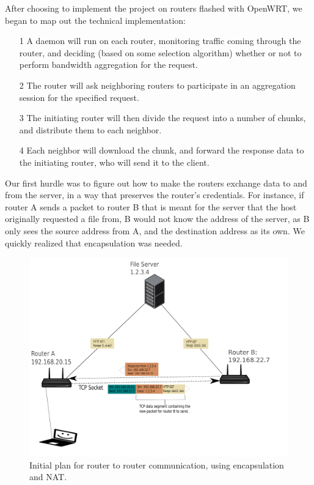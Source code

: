 \documentclass[12pt]{article}
\begin{document}
		After choosing to implement the project on routers flashed with OpenWRT, we began to map out the technical implementation:
		\begin{itemize}
			\item[1] A daemon will run on each router, monitoring traffic coming through the router, and deciding (based on some selection algorithm) whether or not to perform bandwidth aggregation for the request.
			\item[2] The router will ask neighboring routers to participate in an aggregation session for the specified request.
			\item[3] The initiating router will then divide the request into a number of chunks, and distribute them to each neighbor.
			\item[4] Each neighbor will download the chunk, and forward the response data to the initiating router, who will send it to the client.
		\end{itemize}

		Our first hurdle was to figure out how to make the routers exchange data to and from the server, in a way that preserves the router's credentials. For instance, if router A sends a packet to router B that is meant for the server that the host originally requested a file from, B would not know the address of the server, as B only sees the source address from A, and the destination address as its own. We quickly realized that encapsulation was needed. 

		\begin{figure}[H]
			\centering
			\includegraphics[keepaspectratio=true,scale=0.08]{RouterDiagram.png}
			\caption{Initial plan for router to router communication, using encapsulation and NAT.}
		\end{figure}
\end{document}
